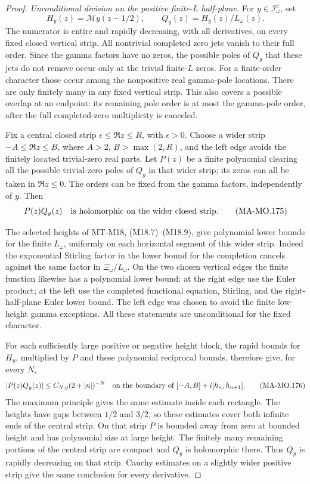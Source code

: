 \begin{proof}
\emph{Unconditional division on the positive finite-\(L\) half-plane.}
For \(y\in\mathscr I^c_\omega\), set
\[
             H_y(z)=\mathcal My(z-1/2),\qquad
                         Q_y(z)=H_y(z)/L_\omega(z).
 \tag{MA-MO.174}
\]
The numerator is entire and rapidly decreasing, with all
derivatives, on every fixed closed vertical strip. All nontrivial
completed zero jets vanish to their full order. Since the gamma
factors have no zeros, the possible poles of \(Q_y\) that these
jets do not remove occur only at the trivial finite-\(L\) zeros.
For a finite-order character those occur among the nonpositive
real gamma-pole locations. There are only finitely many in any
fixed vertical strip. This also covers a possible overlap at
an endpoint: its remaining pole order is at most the gamma-pole
order, after the full completed-zero multiplicity is canceled.

Fix a central closed strip \(\epsilon\le\Re z\le R\), with
\(\epsilon>0\). Choose a wider strip \(-A\le\Re z\le B\),
where \(A>2\), \(B>\max(2,R)\), and the left edge avoids the
finitely located trivial-zero real parts. Let \(P(z)\) be a
finite polynomial clearing all the possible trivial-zero poles
of \(Q_y\) in that wider strip; its zeros can all be taken in
\(\Re z\le0\). The orders can be fixed from the gamma factors,
independently of \(y\). Then
\[
                         P(z)Q_y(z)
       \quad\hbox{is holomorphic on the wider closed strip.}
 \tag{MA-MO.175}
\]

The selected heights of MT-M18, (M18.7)--(M18.9), give polynomial
lower bounds for the finite \(L_\omega\), uniformly on each
horizontal segment of this wider strip. Indeed the exponential
Stirling factor in the lower bound for the completion cancels
against the same factor in \(\Xi_\omega/L_\omega\).
On the two chosen vertical edges the finite function likewise
has a polynomial lower bound: at the right edge use the Euler
product; at the left use the completed functional equation,
Stirling, and the right-half-plane Euler lower bound. The left
edge was chosen to avoid the finite low-height gamma exceptions.
All these statements are unconditional for the fixed character.

For each sufficiently large positive or negative height block,
the rapid bounds for \(H_y\), multiplied by \(P\) and these
polynomial reciprocal bounds, therefore give, for every \(N\),
\[
       |P(z)Q_y(z)|\le C_{N,y}(2+|n|)^{-N}
 \quad\hbox{on the boundary of }
                  [-A,B]+i[h_n,h_{n+1}].
 \tag{MA-MO.176}
\]
The maximum principle gives the same estimate inside each
rectangle. The heights have gaps between \(1/2\) and \(3/2\),
so these estimates cover both infinite ends of the central strip.
On that strip \(P\) is bounded away from zero at bounded height
and has polynomial size at large height. The finitely many
remaining portions of the central strip are compact and \(Q_y\)
is holomorphic there. Thus \(Q_y\) is rapidly decreasing on that strip.
Cauchy estimates on a slightly wider positive strip give the
same conclusion for every derivative.


\end{proof}
